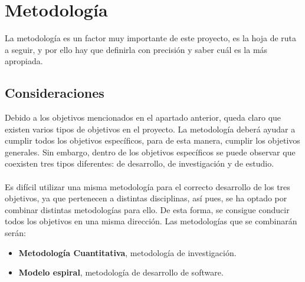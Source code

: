 \chapter{Metodología}
\thispagestyle{fancy}

La metodología es un factor muy importante de este proyecto, es la hoja de ruta a seguir, y por ello hay que definirla con precisión y saber cuál es la más apropiada.

\section{Consideraciones}
Debido a los objetivos mencionados en el apartado anterior, queda claro que existen varios tipos de objetivos en el proyecto. La metodología deberá ayudar a cumplir todos los objetivos específicos, para de esta manera, cumplir los objetivos generales. Sin embargo, dentro de los objetivos específicos se puede observar que coexisten tres tipos diferentes: de desarrollo, de investigación y de estudio.
\\ \\
Es difícil utilizar una misma metodología para el correcto desarrollo de los tres objetivos, ya que pertenecen a distintas disciplinas, así pues, se ha optado por combinar distintas metodologías para ello. De esta forma, se consigue conducir todos los objetivos en una misma dirección. Las metodologías que se combinarán serán:
\begin{itemize}
    \item \textbf{Metodología Cuantitativa}, metodología de investigación.
    \item \textbf{Modelo espiral}, metodología de desarrollo de software.
\end{itemize}

